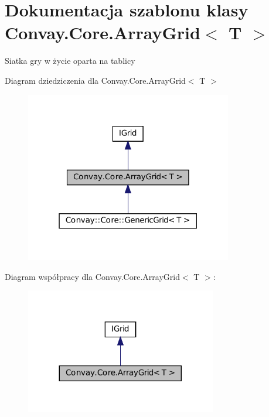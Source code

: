 \hypertarget{class_convay_1_1_core_1_1_array_grid}{}\section{Dokumentacja szablonu klasy Convay.\+Core.\+Array\+Grid$<$ T $>$}
\label{class_convay_1_1_core_1_1_array_grid}


Siatka gry w życie oparta na tablicy  




Diagram dziedziczenia dla Convay.\+Core.\+Array\+Grid$<$ T $>$
\nopagebreak
\begin{figure}[H]
\begin{center}
\leavevmode
\includegraphics[width=256pt]{class_convay_1_1_core_1_1_array_grid__inherit__graph}
\end{center}
\end{figure}


Diagram współpracy dla Convay.\+Core.\+Array\+Grid$<$ T $>$\+:
\nopagebreak
\begin{figure}[H]
\begin{center}
\leavevmode
\includegraphics[width=236pt]{class_convay_1_1_core_1_1_array_grid__coll__graph}
\end{center}
\end{figure}
